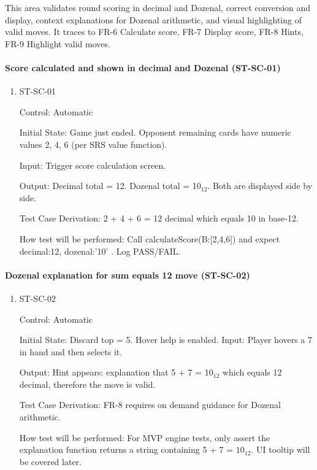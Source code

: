 \documentclass[12pt, titlepage]{article}
\begin{document}
This area validates round scoring in decimal and Dozenal, correct conversion and display, context explanations for Dozenal arithmetic, and visual highlighting of valid moves. It traces to FR-6 Calculate score, FR-7 Display score, FR-8 Hints, FR-9 Highlight valid moves.

\paragraph{Score calculated and shown in decimal and Dozenal (ST-SC-01)}

\begin{enumerate}
\item{ST-SC-01\\}

Control: Automatic
					
Initial State: Game just ended. Opponent remaining cards have numeric values 2, 4, 6 (per SRS value function).
					
Input: Trigger score calculation screen.
					
Output: Decimal total = 12. Dozenal total = 10$_{12}$. Both are displayed side by side.

Test Case Derivation: 2 + 4 + 6 = 12 decimal which equals 10 in base-12.

How test will be performed: Call calculateScore({B:[2,4,6]}) and expect { decimal:12, dozenal:'10' }. Log PASS/FAIL.
\end{enumerate}

\paragraph{Dozenal explanation for sum equals 12 move (ST-SC-02)}

\begin{enumerate}
\item{ST-SC-02\\}

Control: Automatic
					
Initial State: Discard top = 5. Hover help is enabled.					
Input: Player hovers a 7 in hand and then selects it.
					
Output: Hint appears: explanation that 5 + 7 = 10$_{12}$ which equals 12 decimal, therefore the move is valid.

Test Case Derivation: FR-8 requires on demand guidance for Dozenal arithmetic.

How test will be performed: For MVP engine tests, only assert the explanation function returns a string containing 5 + 7 = $10_{12}$. UI tooltip will be covered later.
\end{enumerate}
\end{document}

